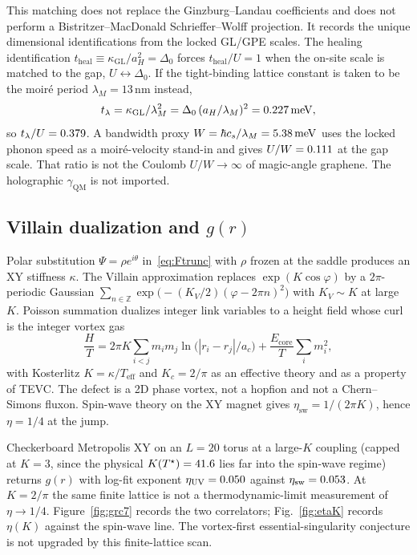 This matching does not replace the Ginzburg--Landau coefficients and does not perform a Bistritzer--MacDonald Schrieffer--Wolff projection. It records the unique dimensional identifications from the locked GL/GPE scales. The healing identification $t_{\mathrm{heal}}\equiv\kappa_{\mathrm{GL}}/a_H^2=\Delta_0$ forces $t_{\mathrm{heal}}/U=1$ when the on-site scale is matched to the gap, $U\leftrightarrow\Delta_0$. If the tight-binding lattice constant is taken to be the moir\'e period $\lambda_M=13$\,nm instead,
\begin{equation}
t_\lambda=\kappa_{\mathrm{GL}}/\lambda_M^2=\Delta_0\,(a_H/\lambda_M)^2=0.227\,\mathrm{meV},
\end{equation}
so $t_\lambda/U=0.379$. A bandwidth proxy $W=\hbar c_s/\lambda_M=5.38\,\mathrm{meV}$ uses the locked phonon speed as a moir\'e-velocity stand-in and gives $U/W=0.111$ at the gap scale. That ratio is not the Coulomb $U/W\to\infty$ of magic-angle graphene. The holographic $\gamma_{\mathrm{QM}}$ is not imported.

\subsection{Villain dualization and $g(r)$}
\label{sec:villain_c7}

Polar substitution $\Psi=\rho e^{i\theta}$ in~\eqref{eq:Ftrunc} with $\rho$ frozen at the saddle produces an XY stiffness $\kappa$. The Villain approximation replaces $\exp(K\cos\varphi)$ by a $2\pi$-periodic Gaussian $\sum_{n\in\mathbb{Z}}\exp\bigl(-(K_V/2)(\varphi-2\pi n)^2\bigr)$ with $K_V\sim K$ at large $K$. Poisson summation dualizes integer link variables to a height field whose curl is the integer vortex gas
\begin{equation}
\frac{H}{T}=2\pi K\sum_{i<j}m_i m_j\ln\bigl(|r_i-r_j|/a_c\bigr)+\frac{E_{\mathrm{core}}}{T}\sum_i m_i^2,
\label{eq:villainCG}
\end{equation}
with Kosterlitz $K=\kappa/T_{\mathrm{eff}}$ and $K_c=2/\pi$ as an effective theory and as a property of TEVC. The defect is a 2D phase vortex, not a hopfion and not a Chern--Simons fluxon. Spin-wave theory on the XY magnet gives $\eta_{\mathrm{sw}}=1/(2\pi K)$, hence $\eta=1/4$ at the jump.

Checkerboard Metropolis XY on an $L=20$ torus at a large-$K$ coupling (capped at $K=3$, since the physical $K(T^\star)=41.6$ lies far into the spin-wave regime) returns $g(r)$ with log-fit exponent $\eta_{\mathrm{UV}}=0.050$ against $\eta_{\mathrm{sw}}=0.053$. At $K=2/\pi$ the same finite lattice is not a thermodynamic-limit measurement of $\eta\to 1/4$. Figure~\ref{fig:grc7} records the two correlators; Fig.~\ref{fig:etaK} records $\eta(K)$ against the spin-wave line. The vortex-first essential-singularity conjecture is not upgraded by this finite-lattice scan.

